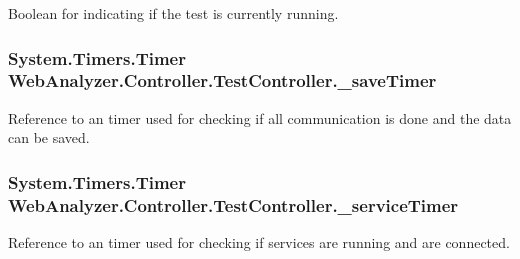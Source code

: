 Boolean for indicating if the test is currently running. 

\hypertarget{class_web_analyzer_1_1_controller_1_1_test_controller_afbf68de453036de4c7e50e3eb23f9ebb}{}
\subsubsection[{\+\_\+save\+Timer}]{\setlength{\rightskip}{0pt plus 5cm}System.\+Timers.\+Timer Web\+Analyzer.\+Controller.\+Test\+Controller.\+\_\+save\+Timer\hspace{0.3cm}{\ttfamily [private]}}\label{class_web_analyzer_1_1_controller_1_1_test_controller_afbf68de453036de4c7e50e3eb23f9ebb}


Reference to an timer used for checking if all communication is done and the data can be saved. 

\hypertarget{class_web_analyzer_1_1_controller_1_1_test_controller_acf2cc373641944c352591c478cf2bd05}{}
\subsubsection[{\+\_\+service\+Timer}]{\setlength{\rightskip}{0pt plus 5cm}System.\+Timers.\+Timer Web\+Analyzer.\+Controller.\+Test\+Controller.\+\_\+service\+Timer\hspace{0.3cm}{\ttfamily [private]}}\label{class_web_analyzer_1_1_controller_1_1_test_controller_acf2cc373641944c352591c478cf2bd05}


Reference to an timer used for checking if services are running and are connected. 

\hypertarget{class_web_analyzer_1_1_controller_1_1_test_controller_a6084bcc401d37f7f8861fc0e9fb771b6}{}
